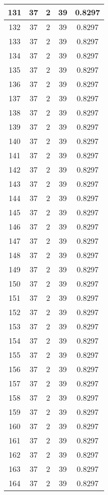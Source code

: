 \documentclass[letterpaper, 12pt]{article}
\begin{document}
\begin{longtable}{|c|c|c|c|c|}
\hline
131 & 37 & 2 & 39 & 0.8297 \\
\hline
132 & 37 & 2 & 39 & 0.8297 \\
\hline
133 & 37 & 2 & 39 & 0.8297 \\
\hline
134 & 37 & 2 & 39 & 0.8297 \\
\hline
135 & 37 & 2 & 39 & 0.8297 \\
\hline
136 & 37 & 2 & 39 & 0.8297 \\
\hline
137 & 37 & 2 & 39 & 0.8297 \\
\hline
138 & 37 & 2 & 39 & 0.8297 \\
\hline
139 & 37 & 2 & 39 & 0.8297 \\
\hline
140 & 37 & 2 & 39 & 0.8297 \\
\hline
141 & 37 & 2 & 39 & 0.8297 \\
\hline
142 & 37 & 2 & 39 & 0.8297 \\
\hline
143 & 37 & 2 & 39 & 0.8297 \\
\hline
144 & 37 & 2 & 39 & 0.8297 \\
\hline
145 & 37 & 2 & 39 & 0.8297 \\
\hline
146 & 37 & 2 & 39 & 0.8297 \\
\hline
147 & 37 & 2 & 39 & 0.8297 \\
\hline
148 & 37 & 2 & 39 & 0.8297 \\
\hline
149 & 37 & 2 & 39 & 0.8297 \\
\hline
150 & 37 & 2 & 39 & 0.8297 \\
\hline
151 & 37 & 2 & 39 & 0.8297 \\
\hline
152 & 37 & 2 & 39 & 0.8297 \\
\hline
153 & 37 & 2 & 39 & 0.8297 \\
\hline
154 & 37 & 2 & 39 & 0.8297 \\
\hline
155 & 37 & 2 & 39 & 0.8297 \\
\hline
156 & 37 & 2 & 39 & 0.8297 \\
\hline
157 & 37 & 2 & 39 & 0.8297 \\
\hline
158 & 37 & 2 & 39 & 0.8297 \\
\hline
159 & 37 & 2 & 39 & 0.8297 \\
\hline
160 & 37 & 2 & 39 & 0.8297 \\
\hline
161 & 37 & 2 & 39 & 0.8297 \\
\hline
162 & 37 & 2 & 39 & 0.8297 \\
\hline
163 & 37 & 2 & 39 & 0.8297 \\
\hline
164 & 37 & 2 & 39 & 0.8297 \\

\end{longtable}
\end{document}
